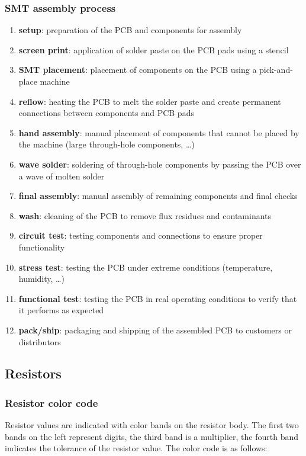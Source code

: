 \subsubsection*{SMT assembly process}
\begin{enumerate}[itemsep=0pt]
	\item \textbf{setup}: preparation of the PCB and components for assembly
	\item \textbf{screen print}: application of solder paste on the PCB pads using a stencil
	\item \textbf{SMT placement}: placement of components on the PCB using a pick-and-place machine
	\item \textbf{reflow}: heating the PCB to melt the solder paste and create permanent connections between components and PCB pads
	\item \textbf{hand assembly}: manual placement of components that cannot be placed by the machine (large through-hole components, \dots)
	\item \textbf{wave solder}: soldering of through-hole components by passing the PCB over a wave of molten solder
	\item \textbf{final assembly}: manual assembly of remaining components and final checks
	\item \textbf{wash}: cleaning of the PCB to remove flux residues and contaminants
	\item \textbf{circuit test}: testing components and connections to ensure proper functionality
	\item \textbf{stress test}: testing the PCB under extreme conditions (temperature, humidity, \dots)
	\item \textbf{functional test}: testing the PCB in real operating conditions to verify that it performs as expected
	\item \textbf{pack/ship}: packaging and shipping of the assembled PCB to customers or distributors
\end{enumerate}

\subsection{Resistors}
\subsubsection*{Resistor color code}
Resistor values are indicated with color bands on the resistor body. The first two bands on the left represent digits, the
third band is a multiplier, the fourth band indicates the tolerance of the resistor value. The color code is as follows:

